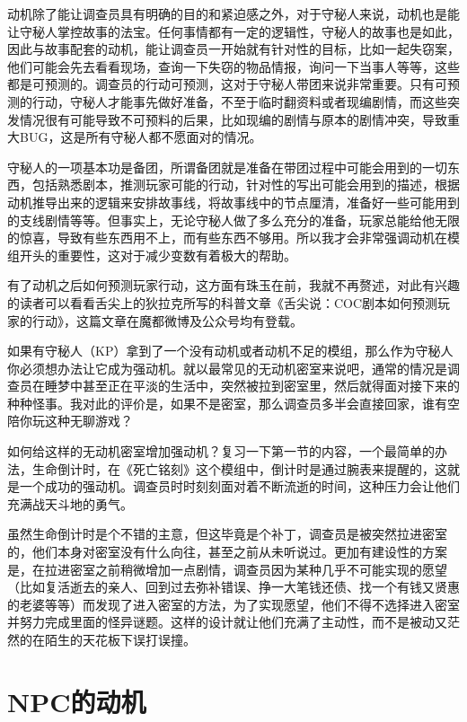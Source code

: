 \documentclass[a4paper,zihao=-4,notitlepage,twoside,openright]{ctexart}
\begin{document}
动机除了能让调查员具有明确的目的和紧迫感之外，对于守秘人来说，动机也是能让守秘人掌控故事的法宝。任何事情都有一定的逻辑性，守秘人的故事也是如此，因此与故事配套的动机，能让调查员一开始就有针对性的目标，比如一起失窃案，他们可能会先去看看现场，查询一下失窃的物品情报，询问一下当事人等等，这些都是可预测的。调查员的行动可预测，这对于守秘人带团来说非常重要。只有可预测的行动，守秘人才能事先做好准备，不至于临时翻资料或者现编剧情，而这些突发情况很有可能导致不可预料的后果，比如现编的剧情与原本的剧情冲突，导致重大BUG，这是所有守秘人都不愿面对的情况。

守秘人的一项基本功是备团，所谓备团就是准备在带团过程中可能会用到的一切东西，包括熟悉剧本，推测玩家可能的行动，针对性的写出可能会用到的描述，根据动机推导出来的逻辑来安排故事线，将故事线中的节点厘清，准备好一些可能用到的支线剧情等等。但事实上，无论守秘人做了多么充分的准备，玩家总能给他无限的惊喜，导致有些东西用不上，而有些东西不够用。所以我才会非常强调动机在模组开头的重要性，这对于减少变数有着极大的帮助。

有了动机之后如何预测玩家行动，这方面有珠玉在前，我就不再赘述，对此有兴趣的读者可以看看舌尖上的狄拉克所写的科普文章《舌尖说：COC剧本如何预测玩家的行动》，这篇文章在魔都微博及公众号均有登载。

如果有守秘人（KP）拿到了一个没有动机或者动机不足的模组，那么作为守秘人你必须想办法让它成为强动机。就以最常见的无动机密室来说吧，通常的情况是调查员在睡梦中甚至正在平淡的生活中，突然被拉到密室里，然后就得面对接下来的种种怪事。我对此的评价是，如果不是密室，那么调查员多半会直接回家，谁有空陪你玩这种无聊游戏？

如何给这样的无动机密室增加强动机？复习一下第一节的内容，一个最简单的办法，生命倒计时，在《死亡铭刻》这个模组中，倒计时是通过腕表来提醒的，这就是一个成功的强动机。调查员时时刻刻面对着不断流逝的时间，这种压力会让他们充满战天斗地的勇气。

虽然生命倒计时是个不错的主意，但这毕竟是个补丁，调查员是被突然拉进密室的，他们本身对密室没有什么向往，甚至之前从未听说过。更加有建设性的方案是，在拉进密室之前稍微增加一点剧情，调查员因为某种几乎不可能实现的愿望（比如复活逝去的亲人、回到过去弥补错误、挣一大笔钱还债、找一个有钱又贤惠的老婆等等）而发现了进入密室的方法，为了实现愿望，他们不得不选择进入密室并努力完成里面的怪异谜题。这样的设计就让他们充满了主动性，而不是被动又茫然的在陌生的天花板下误打误撞。

\section{NPC的动机}
\end{document}
